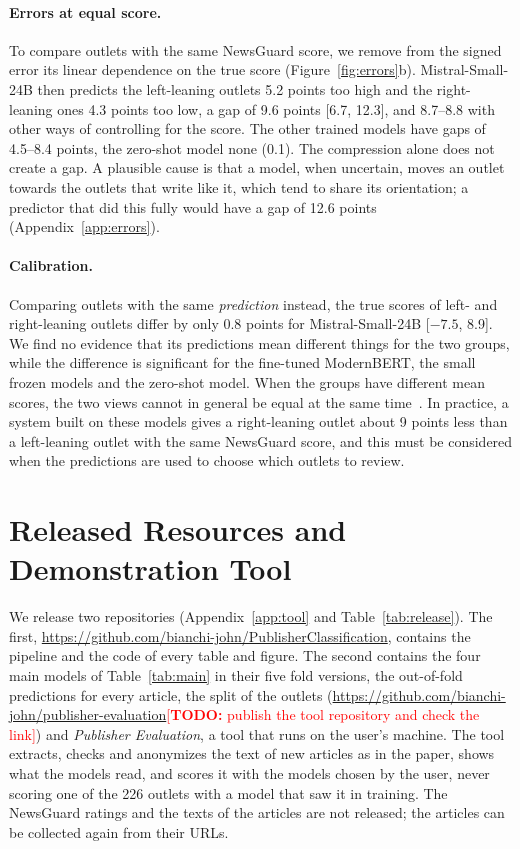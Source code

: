 \documentclass[11pt,a4paper]{article}
\newcommand{\todo}[1]{\textcolor{red}{[\textbf{TODO:} #1]}}
\begin{document}
\paragraph{Errors at equal score.} To compare outlets with the same NewsGuard score, we remove from the signed error its
linear dependence on the true score (Figure~\ref{fig:errors}b). Mistral-Small-24B then predicts the left-leaning outlets
5.2 points too high and the right-leaning ones 4.3 points too low, a gap of 9.6 points [6.7, 12.3], and 8.7--8.8 with
other ways of controlling for the score. The other trained models have gaps of 4.5--8.4 points, the zero-shot model none
(0.1). The compression alone does not create a gap. A plausible cause is that a model, when uncertain, moves an outlet
towards the outlets that write like it, which tend to share its orientation; a predictor that did this fully would have
a gap of 12.6 points (Appendix~\ref{app:errors}).

\paragraph{Calibration.} Comparing outlets with the same \emph{prediction} instead, the true scores of left- and
right-leaning outlets differ by only 0.8 points for Mistral-Small-24B [$-7.5$, 8.9]. We find no evidence that its
predictions mean different things for the two groups, while the difference is significant for the fine-tuned ModernBERT,
the small frozen models and the zero-shot model. When the groups have different mean scores, the two views cannot in
general be equal at the same time~\cite{kleinberg2017inherent,chouldechova2017fair}. In practice, a system built on these
models gives a right-leaning outlet about 9 points less than a left-leaning outlet with the same NewsGuard score, and
this must be considered when the predictions are used to choose which outlets to review.

\section{Released Resources and Demonstration Tool}\label{sec:tool}
We release two repositories (Appendix~\ref{app:tool} and Table~\ref{tab:release}). The first,
\url{https://github.com/bianchi-john/PublisherClassification}, contains the pipeline and the code of every table and
figure. The second contains the four main models of
Table~\ref{tab:main} in their five fold versions, the out-of-fold predictions for every article, the split of the
outlets (\url{https://github.com/bianchi-john/publisher-evaluation}\todo{publish the tool repository and check the link})
and \emph{Publisher Evaluation}, a tool that runs on the user's machine. The tool extracts, checks and anonymizes the
text of new articles as in the paper, shows what the models read, and scores it with the models chosen by the user,
never scoring one of the 226 outlets with a model that saw it in training. The NewsGuard ratings and the texts of the
articles are not released; the articles can be collected again from their URLs.
\end{document}
